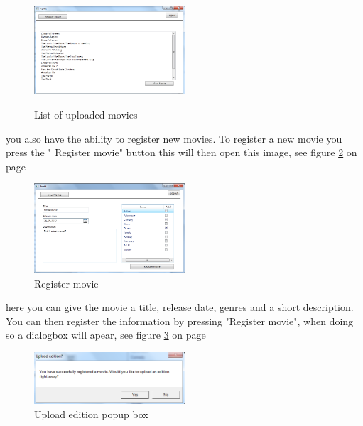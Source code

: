 \begin{figure}[h!]  
  \centering
\includegraphics[width=0.5\textwidth]{Parts/Images/Manual/CPmovielist}
\label{fig:Manual_Client_Navigation_Upload_List}
\caption{List of uploaded movies}
\end{figure}
 
 you also have the ability to register new movies. To register a new movie you press the " Register movie" button this will then open this image, see figure \ref{fig:Manual_Client_Navigation_Upload_Register} on page \pageref{fig:Manual_Client_Navigation_Upload_Register}


\begin{figure}[h!]  
  \centering
\includegraphics[width=0.5\textwidth]{Parts/Images/Manual/CPRegistermovie}
\caption{Register movie}
\label{fig:Manual_Client_Navigation_Upload_Register}
\end{figure}
 
 here you can give the movie a title,  release date, genres and a short description. You can then register the information by pressing "Register movie", when doing so a dialogbox will apear, see figure \ref{fig:Manual_Client_Navigation_Upload_Popup} on page \pageref{fig:Manual_Client_Navigation_Upload_Popup}


\begin{figure}[h!]  
  \centering
\includegraphics[width=0.5\textwidth]{Parts/Images/Manual/RegisterPopup}
\caption{Upload edition popup box}
\label{fig:Manual_Client_Navigation_Upload_Popup}
\end{figure}
 
